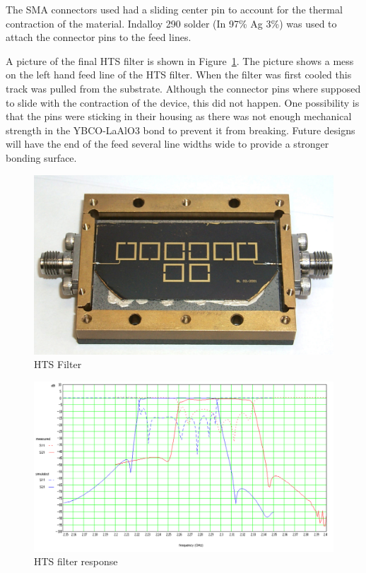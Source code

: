 The SMA connectors used had a sliding center pin to account for the thermal contraction of the material. Indalloy 290 solder (In 97\% Ag 3\%) was used to attach the connector pins to the feed lines.

A picture of the final HTS filter is shown in Figure~\ref{figure:test-hts-open}. The picture shows a mess on the left hand feed line of the HTS filter. When the filter was first cooled this track was pulled from the substrate. Although the connector pins where supposed to slide with the contraction of the device, this did not happen. One possibility is that the pins were sticking in their housing as there was not enough mechanical strength in the YBCO-LaAlO3 bond to prevent it from breaking. Future designs will have the end of the feed several line widths wide to provide a stronger bonding surface.

\begin{figure}[ht]
\begin{center}
\includegraphics[scale=0.25]{fig/test-hts-open.jpg}
\end{center}
\vspace{-1em}
\caption{HTS Filter}
\label{figure:test-hts-open}
\end{figure}

\begin{figure}[ht]
\begin{center}
\includegraphics[scale=0.4]{fig/test-hts-response.pdf}
\end{center}
\vspace{-1em}
\caption{HTS filter response}
\label{figure:test-hts-response}
\end{figure}


